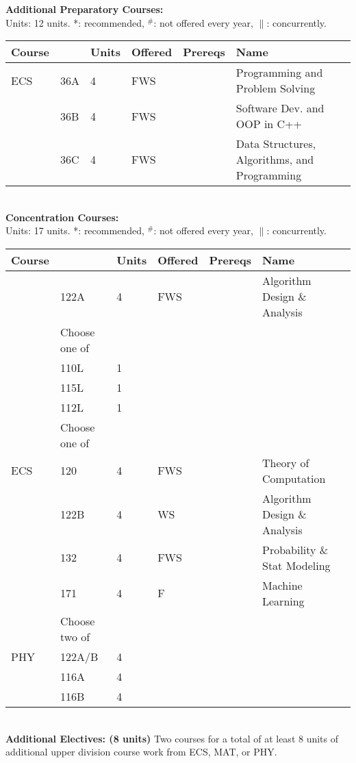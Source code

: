 \documentclass[12pt]{article}
\begin{document}
\newpage
{}
\vskip 0.25cm
\noindent
{\bf Additional Preparatory Courses:  }\\
Units:  12 units. *: recommended, $^\#$: not offered every year, $\parallel$: concurrently.\\
\begin{tabular}{|llllll|}
\hline
Course & & Units & Offered & Prereqs & Name \\
\hline
ECS & 36A  & 4 & FWS & & Programming and Problem Solving\\
    & 36B  & 4 & FWS & & Software Dev. and OOP in C++\\
    & 36C  & 4 & FWS & & Data Structures, Algorithms, and Programming\\
\hline
\end{tabular}\\
\vskip 0.25cm
\noindent
{\bf Concentration Courses:  }\\
Units:  17 units. *: recommended, $^\#$: not offered every year, $\parallel$: concurrently.\\
\begin{tabular}{|llllll|}
\hline
Course & & Units & Offered & Prereqs & Name \\
\hline
& 122A & 4 & FWS & & Algorithm Design \& Analysis\\
\hline
\hline
    & Choose one of & & & & \\
\hline
    & 110L & 1 & & & \\
    & 115L & 1 & & & \\
    & 112L & 1 & & & \\
\hline
\hline
    & Choose one of & & & & \\
\hline
ECS & 120  & 4 & FWS & & Theory of Computation \\
    & 122B & 4 & WS  & & Algorithm Design \& Analysis \\
    & 132  & 4 & FWS & & Probability \& Stat Modeling \\
    & 171  & 4 & F   & & Machine Learning \\
\hline
\hline
    & Choose two of & & & & \\
\hline
PHY & 122A/B & 4 & & & \\
    & 116A   & 4 & & & \\
    & 116B   & 4 & & & \\
\hline
\end{tabular}\\
\vskip 0.25cm
\noindent
{\bf Additional Electives: (8 units)} Two courses for a total of at least 8 units of additional upper division course work from ECS, MAT, or PHY.\\
\end{document}
